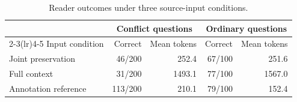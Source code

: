 \begin{table}[pos=H]
\caption{Reader outcomes under three source-input conditions.}\label{tab:reference}
\centering\small
\setlength{\tabcolsep}{6pt}
\begin{tabular}{lrrrr}
\toprule
& \multicolumn{2}{c}{Conflict questions} & \multicolumn{2}{c}{Ordinary questions} \\ \cmidrule(lr){2-3}\cmidrule(lr){4-5} Input condition & Correct & Mean tokens & Correct & Mean tokens \\
\midrule
Joint preservation & 46/200 & 252.4 & 67/100 & 251.6 \\
Full context & 31/200 & 1493.1 & 77/100 & 1567.0 \\
Annotation reference & 113/200 & 210.1 & 79/100 & 152.4 \\
\bottomrule
\end{tabular}
\end{table}
